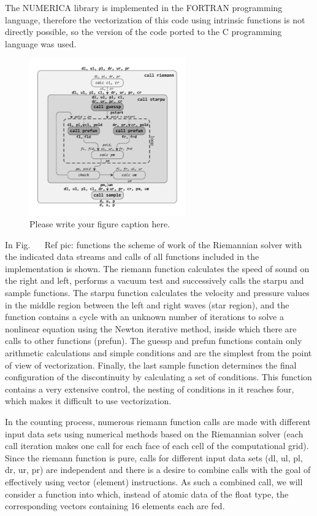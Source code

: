 \documentclass[
11pt,%
tightenlines,%
twoside,%
onecolumn,%
nofloats,%
nobibnotes,%
nofootinbib,%
superscriptaddress,%
noshowpacs,%
centertags]%
{revtex4}
\begin{document}
The NUMERICA library is implemented in the FORTRAN programming language, therefore the vectorization of this code using intrinsic functions is not directly possible, so the version of the code ported to the C programming language was used.

\begin{figure}[h]
\setcaptionmargin{5mm}
\onelinecaptionstrue  %
\includegraphics[width=0.6\textwidth]{pics/riemann.pdf}
\caption{Please write your figure caption here.}\label{fig:1}
\end{figure}

In Fig. ~ \ Ref {pic: functions} the scheme of work of the Riemannian solver with the indicated data streams and calls of all functions included in the implementation is shown. The riemann function calculates the speed of sound on the right and left, performs a vacuum test and successively calls the starpu and sample functions. The starpu function calculates the velocity and pressure values ​​in the middle region between the left and right waves (star region), and the function contains a cycle with an unknown number of iterations to solve a nonlinear equation using the Newton iterative method, inside which there are calls to other functions (prefun). The guessp and prefun functions contain only arithmetic calculations and simple conditions and are the simplest from the point of view of vectorization. Finally, the last sample function determines the final configuration of the discontinuity by calculating a set of conditions. This function contains a very extensive control, the nesting of conditions in it reaches four, which makes it difficult to use vectorization.

In the counting process, numerous riemann function calls are made with different input data sets using numerical methods based on the Riemannian solver (each call iteration makes one call for each face of each cell of the computational grid). Since the riemann function is pure, calls for different input data sets (dl, ul, pl, dr, ur, pr) are independent and there is a desire to combine calls with the goal of effectively using vector (element) instructions. As such a combined call, we will consider a function into which, instead of atomic data of the float type, the corresponding vectors containing 16 elements each are fed.
\end{document}
